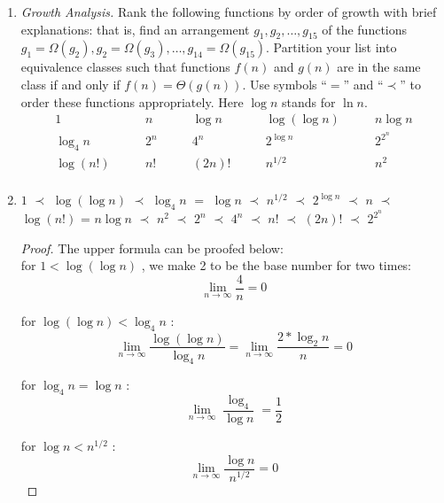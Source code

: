 \documentclass[12pt,a4paper]{article}
\makeatletter
\newtheorem*{solution}{Solution}
\theoremstyle{definition}
\renewenvironment{solution}[1][Solution] {\par\pushQED{\qed}\normalfont\topsep6\p@\@plus6\p@\relax\trivlist\item[\hskip\labelsep\bfseries#1\@addpunct{.}]\ignorespaces}{\popQED\endtrivlist\@endpefalse} \makeatother
\makeatother
\begin{document}
\begin{enumerate}
\item \textit{Growth Analysis.} Rank the following functions by order of growth with brief explanations: that is, find an arrangement $g_1, g_2, \ldots , g_{15}$ of the functions $g_1 = \Omega(g_2), g_2 = \Omega(g_3), \ldots, g_{14} = \Omega(g_{15})$.  Partition your list into equivalence classes such that functions $f(n)$ and $g(n)$ are in the same class if and only if $f(n) = \Theta(g(n))$. Use symbols ``$=$'' and ``$\prec$'' to order these functions appropriately. Here $\log n$ stands for $\ln n$.
$$
\begin{array}{ccccc}
	1 \quad & \quad n \quad & \quad \log n \quad & \quad \log (\log n) \quad & \quad n \log n \\
	\log_4 n \quad & \quad 2^n \quad & \quad 4^n \quad & \quad 2^{\log n} \quad & \quad 2^{2^n} \\
	\log (n!) \quad & \quad n! \quad & \quad (2n)! \quad & \quad  n^{1/2} \quad & \quad n^2 \\
\end{array}
$$
    \begin{solution}
    	$1$ $\prec$ $\log (\log n)$ $\prec$ $\log_4 n$ $=$ $\log n$ $\prec$ $n^{1/2}$
		$\prec$ $2^{\log n}$ $\prec$ $n$ $\prec$ $\log (n!)$ = $n \log n$ 
		$\prec$ $n^2$ $\prec$ $2^n$ $\prec$ $4^n$ $\prec$ $n!$ $\prec$ $(2n)!$ $\prec$ $2^{2^n}$ 
    \end{solution}
    
    \begin{proof}
    The upper formula can be proofed below: \\
        for $1 < \log (\log n) $ , we make 2 to be the base number for two times:
    \begin{equation}
        \lim_{n \to \infty} \frac{4}{n} = 0
    \end{equation}
    
        for $\log (\log n) < \log_4 n$ :
    \begin{equation}
        \lim_{n \to \infty} \frac{\log (\log n)}{\log_4 n} = \lim_{n \to \infty} \frac{2*\log_2 n}{n} = 0
    \end{equation}
    
        for $\log_4 n = \log n $ :
    \begin{equation}
        \lim_{n \to \infty} \frac{\log_4}{\log n} = \frac{1}{2}
    \end{equation}
    
        for $\log n < n^{1/2}$ :
    \begin{equation}
        \lim_{n \to \infty} \frac{\log n}{n^{1/2}} = 0
    \end{equation}
    

\end{proof}
\end{enumerate}
\end{document}
